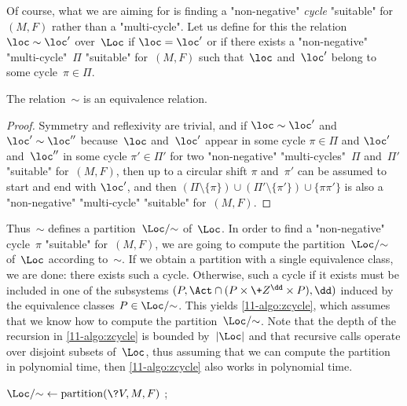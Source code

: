 \begin{scope}
Of course, what we are aiming for is finding a "non-negative"
\emph{cycle} "suitable" for $(M,F)$ rather than a "multi-cycle".
Let us define for this the relation $\loc\sim\loc'$ over~$\Loc$ if
$\loc=\loc'$ or if there exists a "non-negative" "multi-cycle"~$\Pi$
"suitable" for~$(M,F)$ such that~$\loc$ and~$\loc'$ belong to some
cycle~$\pi\in\Pi$.
\begin{claim}\label{11-cl-sim} The relation~$\sim$ is an equivalence
  relation.\end{claim}
\begin{proof}
  Symmetry and reflexivity are trivial, and if $\loc\sim\loc'$ and
  $\loc'\sim\loc''$ because~$\loc$ and~$\loc'$ appear in some cycle
  $\pi\in\Pi$ and $\loc'$ and~$\loc''$ in some cycle $\pi'\in\Pi'$ for
  two "non-negative" "multi-cycles"~$\Pi$ and~$\Pi'$ "suitable"
  for~$(M,F)$, then up to a circular shift $\pi$ and~$\pi'$ can be
  assumed to start and end with $\loc'$, and then
  $(\Pi\setminus\{\pi\})\cup(\Pi'\setminus\{\pi'\})\cup\{\pi\pi'\}$ is
  also a "non-negative" "multi-cycle" "suitable" for~$(M,F)$.
\end{proof}

Thus~$\sim$ defines a partition~$\Loc/{\sim}$ of~$\Loc$.
In order to find a "non-negative" cycle~$\pi$ "suitable" for~$(M,F)$,
we are going to compute the partition~$\Loc/{\sim}$ of~$\Loc$
according to~$\sim$.  If we obtain a partition with a single
equivalence class, we are done: there exists such a cycle.  Otherwise,
such a cycle if it exists must be included in one of the subsystems
$(P,\Act\cap(P\times\+Z^\dd\times P),\dd)$ induced by the equivalence
classes $P\in\Loc/{\sim}$.  This yields \cref{11-algo:zcycle}, which
assumes that we know how to compute the partition~$\Loc/{\sim}$.  Note
that the depth of the recursion in \cref{11-algo:zcycle} is bounded
by~$|\Loc|$ and that recursive calls operate over disjoint subsets
of~$\Loc$, thus assuming that we can compute the partition in
polynomial time, then \cref{11-algo:zcycle} also works in polynomial
time.

\begin{algorithm}

  {
    {}}

$\Loc/{\sim} \leftarrow \mathrm{partition}(\?V,M,F)$ ;



\end{algorithm}
\end{scope}
